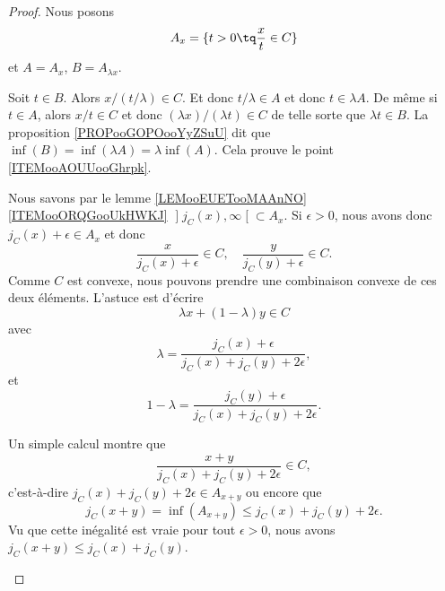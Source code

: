 \begin{proof}
	Nous posons
	\begin{equation}
		A_x=\{ t>0\tq \frac{ x }{ t }\in C \}
	\end{equation}
	et \( A=A_x\), \( B=A_{\lambda x}\).
	\begin{subproof}
		\spitem[\( B=\lambda A\)]
		Soit \( t\in B\). Alors \( x/(t/\lambda)\in C\). Et donc \( t/\lambda\in A\) et donc \( t\in \lambda A\). De même si \( t\in A\), alors \( x/t\in C\) et donc \( (\lambda x)/(\lambda t)\in C\) de telle sorte que \( \lambda t\in B\).
		La proposition \ref{PROPooGOPOooYyZSuU} dit que \( \inf(B)=\inf(\lambda A)=\lambda\inf(A)\). Cela prouve le point \ref{ITEMooAOUUooGhrpk}.


		Nous savons par le lemme \ref{LEMooEUETooMAAnNO}\ref{ITEMooORQGooUkHWKJ} \( \mathopen] j_C(x),\infty\mathclose[\subset A_x\). Si \( \epsilon>0\), nous avons donc \( j_C(x)+\epsilon\in A_x\) et donc
		\begin{equation}
			\frac{ x }{ j_C(x)+\epsilon }\in C,\quad \frac{ y }{ j_C(y)+\epsilon }\in C.
		\end{equation}
		Comme \( C\) est convexe, nous pouvons prendre une combinaison convexe de ces deux éléments. L'astuce est d'écrire
		\begin{equation}
			\lambda x+(1-\lambda)y\in C
		\end{equation}
		avec
		\begin{equation}
			\lambda=\frac{ j_C(x)+\epsilon }{ j_C(x)+j_C(y)+2\epsilon },
		\end{equation}
		et
		\begin{equation}
			1-\lambda=\frac{ j_C(y)+\epsilon }{ j_C(x)+j_C(y)+2\epsilon }.
		\end{equation}

		Un simple calcul montre que
		\begin{equation}
			\frac{ x+y }{ j_C(x)+j_C(y)+2\epsilon }\in C,
		\end{equation}
		c'est-à-dire \( j_C(x)+j_C(y)+2\epsilon\in A_{x+y}\) ou encore que
		\begin{equation}
			j_C(x+y)=\inf(A_{x+y})\leq j_C(x)+j_C(y)+2\epsilon.
		\end{equation}
		Vu que cette inégalité est vraie pour tout \( \epsilon>0\), nous avons \( j_C(x+y)\leq j_C(x)+j_C(y)\).


\end{subproof}
\end{proof}
